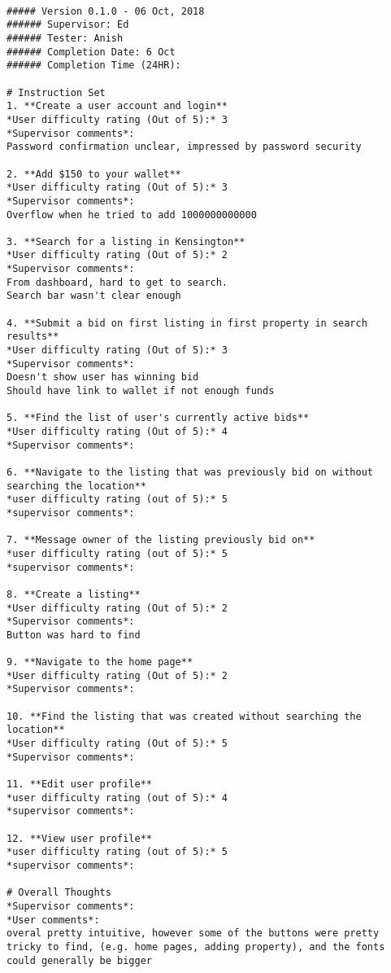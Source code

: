 \begin{lstlisting}

##### Version 0.1.0 - 06 Oct, 2018
###### Supervisor: Ed
###### Tester: Anish
###### Completion Date: 6 Oct
###### Completion Time (24HR):

# Instruction Set
1. **Create a user account and login**
*User difficulty rating (Out of 5):* 3
*Supervisor comments*:
Password confirmation unclear, impressed by password security

2. **Add $150 to your wallet**
*User difficulty rating (Out of 5):* 3
*Supervisor comments*:
Overflow when he tried to add 1000000000000

3. **Search for a listing in Kensington**
*User difficulty rating (Out of 5):* 2
*Supervisor comments*:
From dashboard, hard to get to search.
Search bar wasn't clear enough

4. **Submit a bid on first listing in first property in search results**
*User difficulty rating (Out of 5):* 3
*Supervisor comments*:
Doesn't show user has winning bid
Should have link to wallet if not enough funds

5. **Find the list of user's currently active bids**
*User difficulty rating (Out of 5):* 4
*Supervisor comments*:

6. **Navigate to the listing that was previously bid on without searching the location**
*user difficulty rating (out of 5):* 5
*supervisor comments*:

7. **Message owner of the listing previously bid on**
*user difficulty rating (out of 5):* 5
*supervisor comments*:

8. **Create a listing**
*User difficulty rating (Out of 5):* 2
*Supervisor comments*:
Button was hard to find

9. **Navigate to the home page**
*User difficulty rating (Out of 5):* 2
*Supervisor comments*:

10. **Find the listing that was created without searching the location**
*User difficulty rating (Out of 5):* 5
*Supervisor comments*:

11. **Edit user profile**
*user difficulty rating (out of 5):* 4
*supervisor comments*:

12. **View user profile**
*user difficulty rating (out of 5):* 5
*supervisor comments*:

# Overall Thoughts
*Supervisor comments*:
*User comments*:
overal pretty intuitive, however some of the buttons were pretty tricky to find, (e.g. home pages, adding property), and the fonts could generally be bigger

\end{lstlisting}

